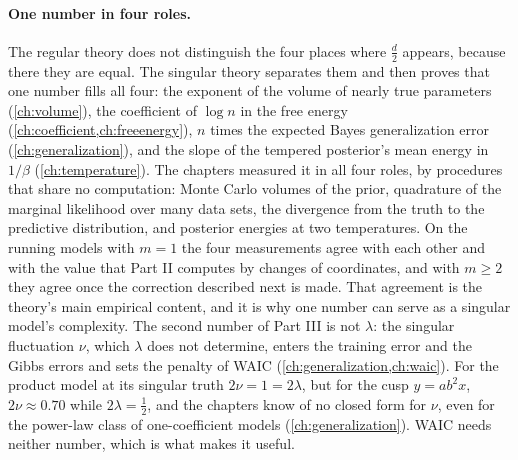 \begin{refsection}
\begin{table}[p]
\begin{fullwidth}
\end{fullwidth}
\caption{The ledger, Parts III and IV. Here $\nu$ is the singular fluctuation, $T_n$ the Bayes training loss, $V_n$ the functional variance, $\beta$ the inverse temperature, $\hat\lambda$ the two-temperature estimate of $\lambda$, $L_n(w_\alpha)$ the empirical loss at the best point of a region, $\wstar$ a local minimum, and $s$ the dimension of a set of critical points.}\label{tab:epilogue:ledger2}
\end{table}


\paragraph{One number in four roles.} The regular theory does not distinguish the four places where $\tfrac d2$ appears, because there they are equal. The singular theory separates them and then proves that one number fills all four: the exponent of the volume of nearly true parameters (\cref{ch:volume}), the coefficient of $\log n$ in the free energy (\cref{ch:coefficient,ch:freeenergy}), $n$ times the expected Bayes generalization error (\cref{ch:generalization}), and the slope of the tempered posterior's mean energy in $1/\beta$ (\cref{ch:temperature}). The chapters measured it in all four roles, by procedures that share no computation: Monte Carlo volumes of the prior, quadrature of the marginal likelihood over many data sets, the divergence from the truth to the predictive distribution, and posterior energies at two temperatures. On the running models with $m=1$ the four measurements agree with each other and with the value that Part II computes by changes of coordinates, and with $m\ge2$ they agree once the correction described next is made. That agreement is the theory's main empirical content, and it is why one number can serve as a singular model's complexity. The second number of Part III is not $\lambda$: the singular fluctuation $\nu$, which $\lambda$ does not determine, enters the training error and the Gibbs errors and sets the penalty of WAIC (\cref{ch:generalization,ch:waic}). For the product model at its singular truth $2\nu=1=2\lambda$, but for the cusp $y=ab^2x$, $2\nu\approx0.70$ while $2\lambda=\frac12$, and the chapters know of no closed form for $\nu$, even for the power-law class of one-coefficient models (\cref{ch:generalization}). WAIC needs neither number, which is what makes it useful.


\end{refsection}
